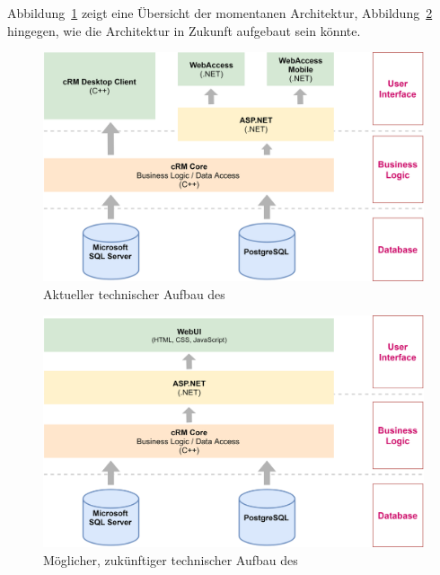 Abbildung~\ref{fig:crm_technical_stack} zeigt eine Übersicht der momentanen Architektur, Abbildung~\ref{fig:crm_future_technical_stack} hingegen, wie die Architektur in Zukunft aufgebaut sein könnte.

\begin{figure}[htb]
    \centering
    \captionsetup{justification=centering}
    \includegraphics[width=\textwidth]{figures/crm_technical_stack.png}
        \caption{Aktueller technischer Aufbau des }\label{fig:crm_technical_stack}
\end{figure}

\begin{figure}[htb]
    \centering
    \captionsetup{justification=centering}
    \includegraphics[width=\textwidth]{figures/crm_future_technical_stack.png}
        \caption{Möglicher, zukünftiger technischer Aufbau des }\label{fig:crm_future_technical_stack}
\end{figure}

\clearpage{}

